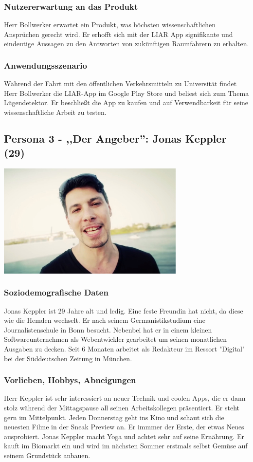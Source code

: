\documentclass[10pt, a4paper, oneside, titlepage]{scrartcl} %
\begin{document}
	\subsubsection{Nutzererwartung an das Produkt}
	Herr Bollwerker erwartet ein Produkt, was höchsten wissenschaftlichen Ansprüchen gerecht wird. Er erhofft sich mit der LIAR App signifikante und eindeutige Aussagen zu den Antworten von zukünftigen Raumfahrern zu erhalten.
	\subsubsection{Anwendungsszenario}
	Während der Fahrt mit den öffentlichen Verkehrsmitteln zu Universität findet Herr Bollwerker die LIAR-App im Google Play Store und beliest sich zum Thema Lügendetektor. Er beschließt die App zu kaufen und auf Verwendbarkeit für seine wissenschaftliche Arbeit zu testen.
	
	\subsection{Persona 3 - ,,Der Angeber'': Jonas Keppler (29)}
	\begin{center}
		\includegraphics[width=0.7\textwidth]{persona_03.jpg}
	\end{center}
	\subsubsection{Soziodemografische Daten}
	Jonas Keppler ist 29 Jahre alt und ledig. Eine feste Freundin hat nicht, da diese wie die Hemden wechselt. Er nach seinem Germanistikstudium eine Journalistenschule in Bonn besucht. Nebenbei hat er in einem kleinen Softwareunternehmen als Webentwickler gearbeitet um seinen monatlichen Ausgaben zu decken. Seit 6 Monaten arbeitet als Redakteur im Ressort "Digital" bei der Süddeutschen Zeitung in München.
	\subsubsection{Vorlieben, Hobbys, Abneigungen}
	Herr Keppler ist sehr interessiert an neuer Technik und coolen Apps, die er dann stolz während der Mittagspause all seinen Arbeitskollegen präsentiert. Er 	steht gern im Mittelpunkt. Jeden Donnerstag geht ins Kino und schaut sich die neuesten Filme in der Sneak Preview an. Er immmer der Erste, der etwas Neues ausprobiert. Jonas Keppler macht Yoga und achtet sehr auf seine Ernährung. Er kauft im Biomarkt ein und wird im nächsten Sommer erstmals selbst Gemüse auf seinem Grundstück anbauen.
\end{document}
